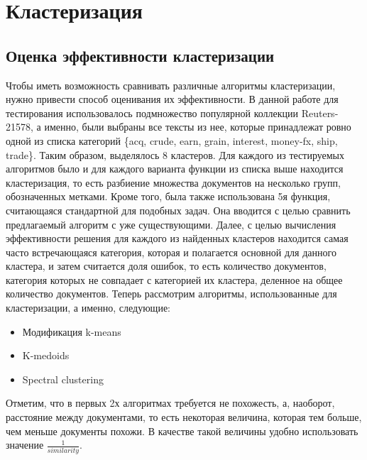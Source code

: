 \section{Кластеризация}
\subsection{Оценка эффективности кластеризации}
Чтобы иметь возможность сравнивать различные алгоритмы кластеризации, нужно привести способ оценивания их эффективности. В данной работе для тестирования использовалось подмножество популярной коллекции Reuters-21578, а именно, были выбраны все тексты из нее, которые принадлежат ровно одной из списка категорий \{acq, crude, earn, grain, interest, money-fx, ship, trade\}. Таким образом, выделялось 8 кластеров.
Для каждого из тестируемых алгоритмов было и для каждого варианта функции из списка выше находится кластеризация, то есть разбиение множества документов на несколько групп, обозначенных метками. Кроме того, была также использована 5я функция, считающаяся стандартной для подобных задач. Она вводится с целью сравнить предлагаемый алгоритм с уже существующими. Далее, с целью вычисления эффективности решения для каждого из найденных кластеров находится самая часто встречающаяся категория, которая и полагается основной для данного кластера, и затем считается доля ошибок, то есть количество документов, категория которых не совпадает с категорией их кластера, деленное на общее количество документов. \newline
Теперь рассмотрим алгоритмы, использованные для кластеризации, а именно, следующие:
\begin{itemize}
\item Модификация k-means
\item K-medoids
\item Spectral clustering
\end{itemize}
Отметим, что в первых 2х алгоритмах требуется не похожесть, а, наоборот, расстояние между документами, то есть некоторая величина, которая тем больше, чем меньше документы похожи. В качестве такой величины удобно использовать значение $\frac{1}{similarity}$.
